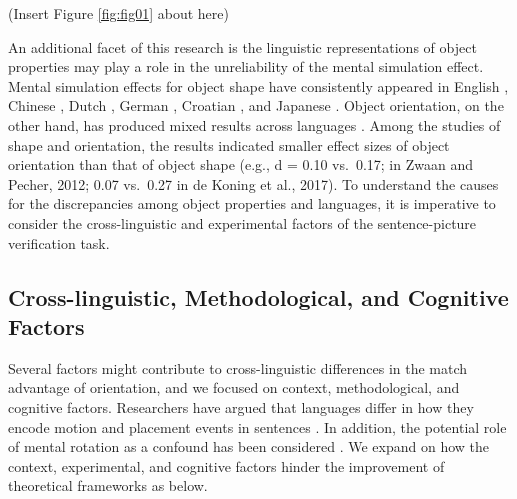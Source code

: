 \documentclass[
  man,floatsintext]{apa6}
\begin{document}
(Insert Figure \ref{fig:fig01} about here)

An additional facet of this research is the linguistic representations of object properties may play a role in the unreliability of the mental simulation effect. Mental simulation effects for object shape have consistently appeared in English \autocite{zwaanEmbodiedSentenceComprehension2005,zwaanParticipantNonnaiveteReproducibility2017,zwaanRevisitingMentalSimulation2012}, Chinese \autocite{liERPStudyMental2017}, Dutch \autocite{engelenPerceptualSimulationDeveloping2011,koning_mental_2017,pecherLanguageComprehendersRetain2009,rommersObjectShapeOrientation2013}, German \autocite{kosterMentalSimulationObject2018}, Croatian \autocite{seticNumericalCongruencyEffect2017}, and Japanese \autocite{satoOneWordTime2013}. Object orientation, on the other hand, has produced mixed results across languages \autocite{chenDoesObjectSize2020,koning_mental_2017,kosterMentalSimulationObject2018,zwaanEmbodiedSentenceComprehension2005,zwaanRevisitingMentalSimulation2012}. Among the studies of shape and orientation, the results indicated smaller effect sizes of object orientation than that of object shape (e.g., d = 0.10 vs.~0.17; in Zwaan and Pecher, 2012; 0.07 vs.~0.27 in de Koning et al., 2017). To understand the causes for the discrepancies among object properties and languages, it is imperative to consider the cross-linguistic and experimental factors of the sentence-picture verification task.

\hypertarget{cross-linguistic-methodological-and-cognitive-factors}{%
\subsection{Cross-linguistic, Methodological, and Cognitive Factors}\label{cross-linguistic-methodological-and-cognitive-factors}}

Several factors might contribute to cross-linguistic differences in the match advantage of orientation, and we focused on context, methodological, and cognitive factors. Researchers have argued that languages differ in how they encode motion and placement events in sentences \autocite{newmanCrosslinguisticOverviewPosture2002,verkerkEvolutionaryDynamicsMotion2014}. In addition, the potential role of mental rotation as a confound has been considered \autocite{rommersObjectShapeOrientation2013}. We expand on how the context, experimental, and cognitive factors hinder the improvement of theoretical frameworks as below.
\end{document}
